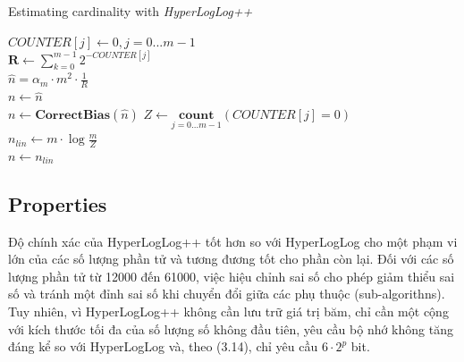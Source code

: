 \documentclass[a4paper,13pt]{article}
\theoremstyle{mytheor}
\begin{document}
\begin{algorithm}[H]
    \vspace{0.25cm}
    \DontPrintSemicolon
    \LinesNumberedHidden
    \caption[]{Estimating cardinality with \textit{HyperLogLog++}}
    $COUNTER[j] \gets 0, j = 0 ... m-1$\\
    $\textbf{R} \gets \sum\limits_{k=0}^{m-1}2^{-COUNTER[j]}$\\
    $\hat{n} = \alpha_m \cdot m^2 \cdot \frac{1}{R}$\\
    $n \gets \hat{n}$\\
    {
        $n \gets \textbf{CorrectBias}(\hat{n})$
    }
    $Z \gets \underset{j=0...m-1}{\textbf{count}}(COUNTER[j] = 0)$\\
    {
        $n_{lin} \gets m \cdot \log\frac{m}{Z}$\\
        {
            $n \gets n_{lin}$
        }
    }
    \vspace{0.25cm}
\end{algorithm}
\subsection*{Properties}
Độ chính xác của HyperLogLog++ tốt hơn so với HyperLogLog cho một phạm vi lớn của các số lượng phần tử và tương đương tốt cho phần còn lại. 
Đối với các số lượng phần tử từ 12000 đến 61000, việc hiệu chỉnh sai số cho phép giảm thiểu sai số và tránh một đỉnh sai số khi chuyển đổi 
giữa các phụ thuộc (sub-algorithns).\\
Tuy nhiên, vì HyperLogLog++ không cần lưu trữ giá trị băm, chỉ cần một cộng với kích thước tối đa của số lượng số không đầu tiên, yêu cầu bộ nhớ 
không tăng đáng kể so với HyperLogLog và, theo (3.14), chỉ yêu cầu $6 \cdot 2^p$ bit.\\
\end{document}

